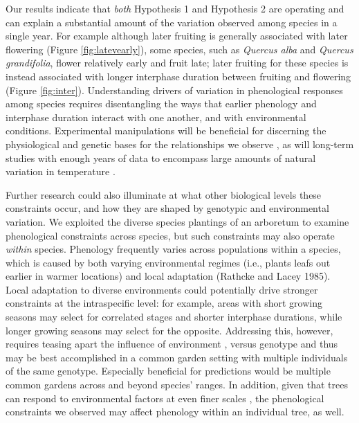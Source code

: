 \documentclass{article}
\begin{document}
\par Our results indicate that \textit{both} Hypothesis 1 and Hypothesis 2 are operating and can explain a substantial amount of the variation observed among species in a single year. For example although later fruiting is generally associated with later flowering (Figure \ref{fig:latevearly}), some species, such as \textit{Quercus alba} and \textit{Quercus grandifolia}, flower relatively early and fruit late; later fruiting for these species is instead associated with longer interphase duration between fruiting and flowering (Figure \ref{fig:inter}).  Understanding drivers of variation in phenological responses among species requires disentangling the ways that earlier phenology and interphase duration interact with one another, and with environmental conditions. Experimental manipulations will be beneficial for discerning the physiological and genetic bases for the relationships we observe \citep{flint1974}, as will long-term studies with enough years of data to encompass large amounts of natural variation in temperature \citep[e.g.,][]{inouye2008}.

\par Further research could also illuminate at what other biological levels these constraints occur, and how they are shaped by genotypic and environmental variation. We exploited the diverse species plantings of an arboretum to examine phenological constraints across species, but such constraints may also operate \emph{within} species. Phenology frequently varies across populations within a species, which is caused by both varying environmental regimes (i.e., plants leafs out earlier in warmer locations) and local adaptation (Rathcke and Lacey 1985). Local adaptation to diverse environments could potentially drive stronger constraints at the intraspecific level: for example, areas with short growing seasons may select for correlated stages and shorter interphase durations, while longer growing seasons may select for the opposite. Addressing this, however, requires teasing apart the influence of environment \citep[even to the microclimatic level][]{SCHWARTZ.IJBiomet.2013}, versus genotype and thus may be best accomplished in a common garden setting with multiple individuals of the same genotype. Especially beneficial for predictions would be multiple common gardens across and beyond species' ranges. In addition, given that trees can respond  to environmental factors at even finer scales \citep[e.g., the branch level,][]{nakamura2010}, the phenological constraints we observed may affect phenology within an individual tree, as well. 
\end{document}

